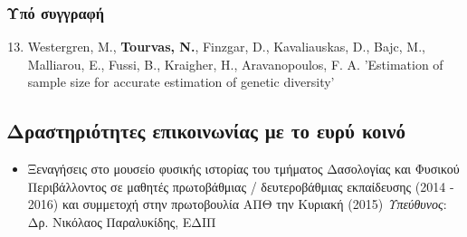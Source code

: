 \documentclass[12pt,]{scrartcl}
\begin{document}
\subsubsection{Υπό συγγραφή}\label{book-chapters}

\begin{enumerate}
	\setcounter{enumi}{12}
\leftskip-0.07in
\vspace{-3mm}

\item Westergren, M., \textbf{Tourvas, N.}, Finzgar, D., Kavaliauskas, D., Bajc, M., Malliarou, E., Fussi, B., Kraigher, H., Aravanopoulos, F. A. 'Estimation of sample size for accurate estimation of genetic diversity'

\end{enumerate}

\subsection{Δραστηριότητες επικοινωνίας με το ευρύ κοινό}\label{public_outreach}
\begin{itemize}
\vspace{-3mm}
\setlength\itemsep{-0.6em}
\item Ξεναγήσεις στο μουσείο φυσικής ιστορίας του τμήματος Δασολογίας και Φυσικού Περιβάλλοντος σε μαθητές πρωτοβάθμιας / δευτεροβάθμιας εκπαίδευσης (2014 - 2016) και συμμετοχή στην πρωτοβουλία ΑΠΘ την Κυριακή (2015)
\vspace{2mm}
\newline
\textit{Υπεύθυνος}: Δρ. Νικόλαος Παραλυκίδης, ΕΔΙΠ
\end{itemize}




\end{document}
